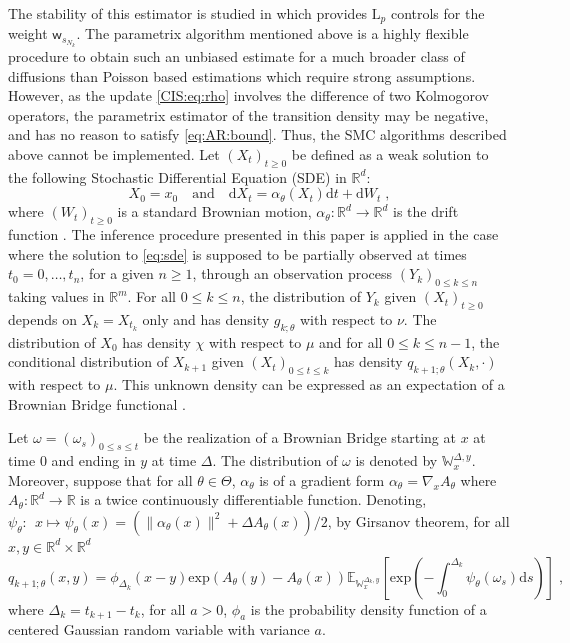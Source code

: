 \documentclass{article}
\def\dimX{d}
\def\Xset{\mathbb{R}^d}
\newcommand{\md}[1]{g_{#1}}
\newcommand{\parvec}{\theta}
\newcommand{\parspace}{\Theta}
\newcommand{\hd}[1]{q_{#1}}
\newcommand{\rset}{\ensuremath{\mathbb{R}}}
\newcommand{\rmd}{\ensuremath{\mathrm{d}}}
\newcommand{\eqsp}{\;}
\begin{document}
The stability of this estimator is studied in \cite{fearnhead2017continuous} which provides $\mathrm{L}_p$ controls for the weight $\mathsf{w}_{s_{N_k}}$. 
The parametrix algorithm mentioned above is a highly flexible procedure to obtain such an unbiased estimate for a much broader class of diffusions than Poisson based estimations which require strong assumptions. 
However, as the update \eqref{CIS:eq:rho} involves the difference of two Kolmogorov operators, the parametrix estimator of the transition density may be negative, and has no reason to satisfy \eqref{eq:AR:bound}.
Thus, the SMC algorithms described above cannot be implemented.
Let $(X_t)_{t\ge 0}$ be defined as a weak solution to the following Stochastic Differential Equation (SDE) in $\mathbb{R}^d$:
\begin{equation}
\label{eq:sde}
X_0 = x_0 \quad\mbox{and}\quad \rmd X_t = \alpha_{\parvec}(X_t)\rmd t + \rmd W_t\eqsp,
\end{equation}
where $(W_t)_{t\geqslant 0}$ is a standard Brownian motion, $\alpha_{\parvec}: \Xset\to\Xset$ is the drift function
. The inference procedure presented in this paper is applied in the case where the solution to \eqref{eq:sde} is supposed to be partially observed at times $t_0 = 0,\ldots,t_n$, for a given $n\geqslant 1$, through an observation process $(Y_k)_{0\leqslant k \leqslant n}$ taking values in $\mathbb{R}^m$. For all $0\leqslant k \leqslant n$, the distribution of $Y_k$ given $(X_t)_{t\geqslant 0}$ depends on $X_k = X_{t_k}$ only and has density $\md{k;\parvec}$ with respect to $\nu$. The distribution of $X_0$ has density $\chi$ with respect to $\mu$ and for all $0\leqslant k \leqslant n-1$, the conditional distribution of $X_{k+1} $ given $(X_{t})_{0\leqslant t\leqslant k}$ has density $\hd{k+1;\parvec}(X_{k},\cdot)$ with respect to $\mu$. 
This unknown density can be expressed as an expectation of a Brownian Bridge functional \cite{dacunha1986estimation}.

Let $\omega = (\omega_s)_{0 \leq s \leq t}$ be the realization of a Brownian Bridge starting at $x$ at time 0 and ending in $y$ at time $\Delta$. The distribution of $\omega$ is denoted by  $\mathbb{W}_x^{\Delta,y}$. 
Moreover, suppose that for all $\parvec\in\parspace$, $\alpha_{\parvec}$ is of a gradient form $\alpha_{\parvec} = \nabla_x A_{\parvec}$ where $A_{\parvec}:\Xset \to \rset$ is a twice continuously differentiable function. Denoting, $ \psi_\theta:~~x \mapsto  \psi_\theta(x) = (\|\alpha_{\parvec}(x)\|^2 + \Delta A_{\parvec}(x))/2$, by Girsanov theorem, for all $x, y \in \mathbb{R}^d \times \mathbb{R}^d$
\begin{equation}
\label{eq:q:girsanov}
\hd{k+1;\parvec}(x,y) = \phi_{\Delta_k}(x-y)\mathrm{exp}\left(A_{\parvec}(y) - A_{\parvec}(x)\right)\mathbb{E}_{\mathbb{W}_x^{\Delta_k,y}}\left[\mathrm{exp}\left(-\int_0^{\Delta_k} \psi_{\parvec}(\omega_s)\rmd s\right)\right]\eqsp,
\end{equation}
where $\Delta_k = t_{k+1}-t_k$, for all $a>0$, $\phi_a$ is the probability density function of a centered Gaussian random variable with variance $a$.
\end{document}
